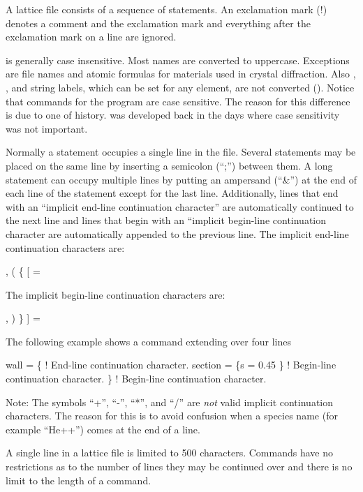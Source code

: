 A \bmad lattice file consists of a sequence of statements. An exclamation mark (!) denotes a comment
and the exclamation mark and everything after the exclamation mark on a line are ignored.  

\bmad is generally case insensitive. Most names are converted to uppercase. Exceptions are 
file names and atomic formulas for materials used in crystal diffraction. Also , ,
and  string labels, which can be set for any element, are not converted ().
Notice that commands for the  program are case sensitive. The reason for this difference is
due to one of history. \bmad was developed back in the days where case sensitivity was not important.

Normally a statement occupies a single line in the file. Several statements may be placed on the
same line by inserting a semicolon (``;'') between them. A long statement can occupy multiple lines
by putting an ampersand (``\&'') at the end of each line of the statement except for the last
line. Additionally, lines that end with an ``implicit end-line continuation character'' are automatically
continued to the next line and lines that begin with an ``implicit begin-line continuation character are
automatically appended to the previous line. The implicit end-line continuation characters are:
\begin{example}
  ,   (   \{   [   =
\end{example}
The implicit begin-line continuation characters are:
\begin{example}
  ,   )   \}   ]   =
\end{example}
The following example shows a command extending over four lines
\begin{example}
  wall = \{               ! End-line continuation character.
    section = \{s = 0.45 
    \}                    ! Begin-line continuation character.
  \}                      ! Begin-line continuation character.
\end{example}
Note: The symbols ``+'', ``-'', ``*'', and ``/'' are {\em not} valid implicit continuation
characters. The reason for this is to avoid confusion when a species name (for example ``He++'')
comes at the end of a line.

A single line in a lattice file is limited to 500 characters. Commands have no restrictions as to
the number of lines they may be continued over and there is no limit to the length of a command.

